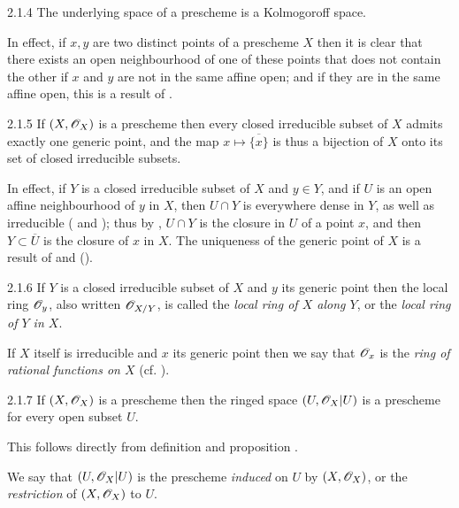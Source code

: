 \documentclass[10pt,oneside]{book}
\begin{document}
\begin{envs}[Proposition]{2.1.4}
\label{prop-1.2.1.4}
The underlying space of a prescheme is a Kolmogoroff space.
\end{envs}

In effect, if $x,y$ are two distinct points of a prescheme $X$ then it is clear
that there exists an open neighbourhood of one of these points that does not
contain the other if $x$ and $y$ are not in the same affine open; and if they
are in the same affine open, this is a result of .

\begin{envs}[Proposition]{2.1.5}
\label{prop-1.2.1.5}
If $(X,\mathscr{O}_X)$ is a prescheme then every closed
irreducible subset of $X$ admits exactly one generic point, and the map
$x\mapsto\overline{\{x\}}$ is thus a bijection of $X$ onto its set of closed
irreducible subsets.
\end{envs}

In effect, if $Y$ is a closed irreducible subset of $X$ and $y\in Y$, and if $U$
is an open affine neighbourhood of $y$ in $X$, then $U\cap Y$ is everywhere
dense in $Y$, as well as irreducible ( and ); thus by
, $U\cap Y$ is the closure in $U$ of a point $x$, and then
$Y\subset\overline{U}$ is the closure of $x$ in $X$.  The uniqueness of the
generic point of $X$ is a result of  and ().

\begin{env}{2.1.6}
\label{env-1.2.1.6}
If $Y$ is a closed irreducible subset of $X$ and $y$ its
generic point then the local ring $\mathscr{O}_y$, also written $\mathscr{O}_{X/Y}$, is called the
\emph{local ring of $X$ along $Y$}, or the \emph{local ring of $Y$ in $X$}.

If $X$ itself is irreducible and $x$ its generic point then we say that
$\mathscr{O}_x$ is the \emph{ring of rational functions on $X$} (cf. ).
\end{env}

\begin{envs}[Proposition]{2.1.7}
\label{prop-1.2.1.7}
If $(X,\mathscr{O}_X)$ is a prescheme then the ringed
space $(U,\mathscr{O}_X|U)$ is a prescheme for every open subset $U$.
\end{envs}

This follows directly from definition  and proposition .

We say that $(U,\mathscr{O}_X|U)$ is the prescheme \emph{induced} on $U$ by
$(X,\mathscr{O}_X)$, or the \emph{restriction} of $(X,\mathscr{O}_X)$ to $U$.
\end{document}
